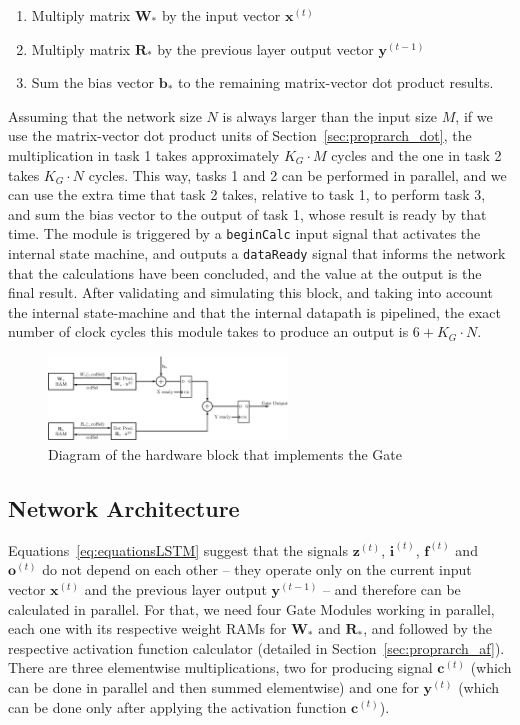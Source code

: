 \documentclass{IEEEtran}
\newcommand{\mb}[1]{\mathbf{#1}}
\begin{document}
\begin{enumerate}
    \item Multiply matrix $\mb{W}_*$ by the input vector $\mb{x}^{(t)}$
    \item Multiply matrix $\mb{R}_*$ by the previous layer output vector $\mb{y}^{(t-1)}$
    \item Sum the bias vector $\mb{b}_*$ to the remaining matrix-vector dot product results.
\end{enumerate}
Assuming that the network size $N$ is always larger than the input size $M$, if we use the matrix-vector dot product units of Section~\ref{sec:proprarch_dot}, the multiplication
in task 1 takes approximately $K_G\cdot M$ cycles and the one in task 2 takes $K_G\cdot N$ cycles. This way, tasks 1 and 2 can be performed in parallel, and we can use the extra
time that task 2 takes, relative to task 1,  to perform task 3, and sum the bias vector to the output of task 1, whose result is ready by that time. The module is triggered by a
\verb+beginCalc+ input signal that activates the internal state machine, and outputs a \verb+dataReady+ signal that informs the network that the calculations have been concluded,
and the value at the output is the final result.
After validating and simulating this block, and taking into account the internal state-machine and that the internal datapath is pipelined, the exact number
of clock cycles this module takes to produce an output is $6+K_G\cdot N$.

\begin{figure}
    \centering
    \includegraphics[width=2.5in]{figures/gate.eps}
    \caption[Diagram of the hardware block that implements the Gate]{Diagram of the hardware block that implements the Gate}
    \label{fig:gate}
\end{figure}

\subsection{Network Architecture}\label{sec:proprarch_net}
Equations~\ref{eq:equationsLSTM} suggest that the signals $\mb{z}^{(t)}$, $\mb{i}^{(t)}$, $\mb{f}^{(t)}$ and $\mb{o}^{(t)}$ do not depend on each other -- they
operate only on the current input vector $\mb{x}^{(t)}$ and the previous layer output $\mb{y}^{(t-1)}$ -- and therefore can be calculated in parallel. For that, we
need four Gate Modules working in parallel, each one with its respective weight RAMs for $\mb{W}_*$ and $\mb{R}_*$, and followed by the respective activation
function calculator (detailed in Section~\ref{sec:proprarch_af}). There are three elementwise multiplications, two for producing signal $\mb{c}^{(t)}$ (which
can be done in parallel and then summed elementwise) and one for $\mb{y}^{(t)}$ (which can be done only after applying the activation function $\mb{c}^{(t)}$).
\end{document}
